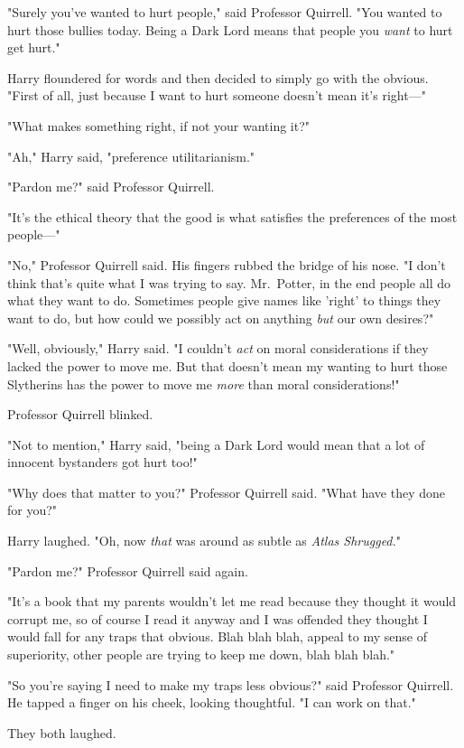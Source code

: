 "Surely you've wanted to hurt people," said Professor Quirrell. "You wanted to hurt those bullies today. Being a Dark Lord means that people you \emph{want} to hurt get hurt."

Harry floundered for words and then decided to simply go with the obvious. "First of all, just because I want to hurt someone doesn't mean it's right---"

"What makes something right, if not your wanting it?"

"Ah," Harry said, "preference utilitarianism."

"Pardon me?" said Professor Quirrell.

"It's the ethical theory that the good is what satisfies the preferences of the most people---"

"No," Professor Quirrell said. His fingers rubbed the bridge of his nose. "I don't think that's quite what I was trying to say. Mr.~Potter, in the end people all do what they want to do. Sometimes people give names like 'right' to things they want to do, but how could we possibly act on anything \emph{but} our own desires?"

"Well, obviously," Harry said. "I couldn't \emph{act} on moral considerations if they lacked the power to move me. But that doesn't mean my wanting to hurt those Slytherins has the power to move me \emph{more} than moral considerations!"

Professor Quirrell blinked.

"Not to mention," Harry said, "being a Dark Lord would mean that a lot of innocent bystanders got hurt too!"

"Why does that matter to you?" Professor Quirrell said. "What have they done for you?"

Harry laughed. "Oh, now \emph{that} was around as subtle as \emph{Atlas Shrugged.}"

"Pardon me?" Professor Quirrell said again.

"It's a book that my parents wouldn't let me read because they thought it would corrupt me, so of course I read it anyway and I was offended they thought I would fall for any traps that obvious. Blah blah blah, appeal to my sense of superiority, other people are trying to keep me down, blah blah blah."

"So you're saying I need to make my traps less obvious?" said Professor Quirrell. He tapped a finger on his cheek, looking thoughtful. "I can work on that."

They both laughed.

